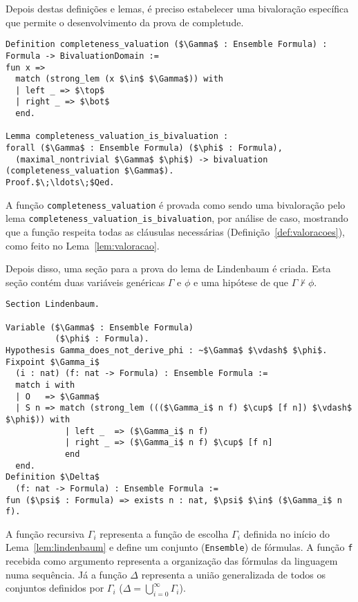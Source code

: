         Depois destas definições e lemas, é preciso estabelecer uma bivaloração específica que permite o desenvolvimento da prova de completude.
        
        \begin{lstlisting}[name=Completeness, frame=single, language=coq]
Definition completeness_valuation ($\Gamma$ : Ensemble Formula) : 
Formula -> BivaluationDomain :=
fun x =>
  match (strong_lem (x $\in$ $\Gamma$)) with
  | left _ => $\top$
  | right _ => $\bot$
  end.

Lemma completeness_valuation_is_bivaluation : 
forall ($\Gamma$ : Ensemble Formula) ($\phi$ : Formula), 
  (maximal_nontrivial $\Gamma$ $\phi$) -> bivaluation (completeness_valuation $\Gamma$).
Proof.$\;\ldots\;$Qed.
        \end{lstlisting}

        A função \texttt{completeness\_valuation} é provada como sendo uma bivaloração pelo lema \texttt{completeness\_valuation\_is\_bivaluation}, por análise de caso, mostrando que a função respeita todas as cláusulas necessárias (Definição~\ref{def:valoracoes}), como feito no Lema~\ref{lem:valoracao}.
    
        Depois disso, uma seção para a prova do lema de Lindenbaum é criada. Esta seção contém duas variáveis genéricas $\Gamma$ e $\phi$ e uma hipótese de que $\Gamma \nvdash \phi$.

        \begin{lstlisting}[name=Completeness, frame=single, language=coq]
Section Lindenbaum.

Variable ($\Gamma$ : Ensemble Formula)
          ($\phi$ : Formula).
Hypothesis Gamma_does_not_derive_phi : ~$\Gamma$ $\vdash$ $\phi$.
Fixpoint $\Gamma_i$ 
  (i : nat) (f: nat -> Formula) : Ensemble Formula :=
  match i with
  | O   => $\Gamma$
  | S n => match (strong_lem ((($\Gamma_i$ n f) $\cup$ [f n]) $\vdash$ $\phi$)) with
            | left _  => ($\Gamma_i$ n f)
            | right _ => ($\Gamma_i$ n f) $\cup$ [f n]
            end
  end.
Definition $\Delta$
  (f: nat -> Formula) : Ensemble Formula :=
fun ($\psi$ : Formula) => exists n : nat, $\psi$ $\in$ ($\Gamma_i$ n f).

        \end{lstlisting}

        A função recursiva \texttt{$\Gamma_i$} representa a função de escolha $\Gamma_i$ definida no início do Lema~\ref{lem:lindenbaum} e define um conjunto (\texttt{Ensemble}) de fórmulas. A função \texttt{f} recebida como argumento representa a organização das fórmulas da linguagem numa sequência. Já a função \texttt{$\Delta$} representa a união generalizada de todos os conjuntos definidos por \texttt{$\Gamma_i$} ($\Delta = \bigcup_{i=0}^{\infty}\Gamma_i$). 

